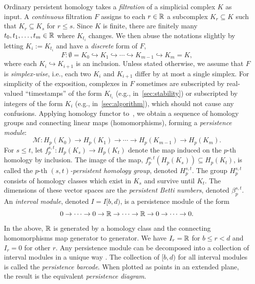 \documentclass[10pt,a4paper]{amsart}
\newcommand {\mm}[1] {\ifmmode{#1}\else{\mbox{\(#1\)}}\fi}
\newcommand{\Rspace}        {\mm{\mathbb{R}}}
\theoremstyle{definition}
\newcommand{\Mcal}{\mathcal{M}}
\newcommand{\filt}{F}
\theoremstyle{remark}
\begin{document}
Ordinary persistent homology takes a \emph{filtration} of a simplicial complex $K$ as input. A \emph{continuous}  filtration $F$  assigns to each $r\in \Rspace$ a subcomplex $K_r \subseteq K$ such that  $K_r \subseteq K_s$ for $r \leq s$. 
Since $K$ is finite, there are finitely many  $t_0,t_1, \ldots, t_m \in \Rspace$ where $K_{t_i}$ changes. 
 We then abuse the notations slightly by
letting $K_i := K_{t_i}$ and have a \emph{discrete} form of $F$,
\begin{equation}
\label{eq:fcomplex}
    \filt:\emptyset = K_0 \hookrightarrow K_1 \hookrightarrow \cdots \hookrightarrow K_{m-1} \hookrightarrow K_m=K,
\end{equation}
where
each $K_i \hookrightarrow K_{i+1}$ is an inclusion. 
Unless stated otherwise, we assume that $\filt$ is \emph{simplex-wise}, i.e., each 
two 
$K_i$ and $K_{i+1}$ differ by at most a single simplex. 
For simplicity of the exposition,
complexes in $\filt$ sometimes are
subscripted by real-valued ``timestamps'' of the form $K_{t_i}$ (e.g., in~\cref{sec:stability}) or subscripted by integers of the form $K_i$ (e.g., in~\cref{sec:algorithm}), which  should not cause any confusions.
Applying homology functor to~, we obtain a sequence of homology groups and connecting linear maps (homomorphisms), forming a \emph{persistence module}:
\begin{equation}\label{eq:fhomology}
\Mcal: H_p(K_0) \to H_p(K_1) \to  \cdots \to H_p(K_{m-1}) \to H_p(K_m).   
\end{equation} 
For $s\leq t$, let $f^{s,t}_p: H_p(K_s) \rightarrow H_p(K_t)$ denote the map induced on the $p$-th homology by  inclusion.
The image of the map, $f^{s,t}_p(H_p(K_s)) \subseteq H_p(K_t)$, is called the $p$-th \emph{$(s,t)$-persistent homology group}, denoted $H_p^{s,t}$. The group $H_p^{s,t}$
consists of homology classes which exist in $K_s$ and survive until $K_t$. The dimensions of these vector spaces are the \emph{persistent Betti numbers}, denoted $\beta^{s,t}_p$.
An \emph{interval module}, denoted $I=I[b,d)$, is a persistence module of the form
\[ 0 \rightarrow \cdots \rightarrow 0 \rightarrow \Rspace \rightarrow \cdots \rightarrow \Rspace \rightarrow 0 \rightarrow \cdots \rightarrow 0.\]
In the above, $\Rspace$ is generated by a homology class and the connecting homomorphisms map generator to generator. 
We have $I_r = \Rspace$
for $b \leq r < d$ and $I_r=0$ for other $r$. 
Any persistence module can be decomposed into a collection of interval modules in a unique way \cite{LuoHenselman-Petrusek2023}. 
The collection of $[b,d)$ for all interval modules is called the \emph{persistence barcode}. 
When plotted as points in an extended plane, the result is the equivalent \emph{persistence diagram}. 
 
\end{document}
